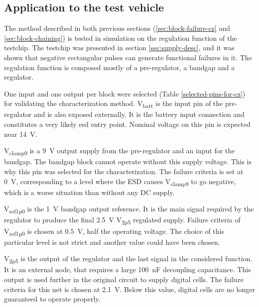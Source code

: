 \subsection{Application to the test vehicle}
\label{sec:application-test-vehicle}

The method described in both previous sections (\ref{sec:block-failure-cz} and \ref{sec:block-chaining}) is tested in simulation on the regulation function of the testchip.
The testchip was presented in section \ref{sec:supply-desc}, and it was shown that negative rectangular pulses can generate functional failures in it.
The regulation function is composed mostly of a pre-regulator, a bandgap and a regulator.

One input and one output per block were selected (Table \ref{selected-pins-for-cz}) for validating the characterization method.
V\textsubscript{batt} is the input pin of the pre-regulator and is also exposed externally.
It is the battery input connection and constitutes a very likely \gls{esd} entry point.
Nominal voltage on this pin is expected near \SI{14}{\volt}.

V\textsubscript{clamp9} is a \SI{9}{\volt} output supply from the pre-regulator and an input for the bandgap.
The bandgap block cannot operate without this supply voltage.
This is why this pin was selected for the characterization.
The failure criteria is set at \SI{0}{\volt}, corresponding to a level where the ESD causes V\textsubscript{clamp9} to go negative, which is a worse situation than without any DC supply.

V\textsubscript{ref1p0} is the \SI{1}{\volt} bandgap output reference.
It is the main signal required by the regulator to produce the final \SI{2.5}{\volt} V\textsubscript{2p5} regulated supply.
Failure criteria of V\textsubscript{ref1p0} is chosen at \SI{0.5}{\volt}, half the operating voltage.
The choice of this particular level is not strict and another value could have been chosen.

V\textsubscript{2p5} is the output of the regulator and the last signal in the considered function.
It is an external node, that requires a large \SI{100}{\nano\farad} decoupling capacitance.
This output is used further in the original circuit to supply digital cells.
The failure criteria for this net is chosen at \SI{2.1}{\volt}.
Below this value, digital cells are no longer guaranteed to operate properly.

